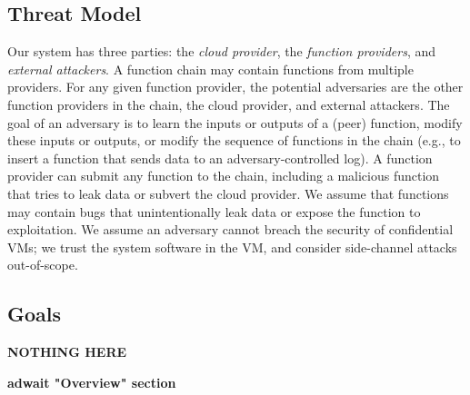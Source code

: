 \subsection{Threat Model}
\label{sec:threat-model}

Our system has three parties: the \emph{cloud provider}, the \emph{function
providers}, and \emph{external attackers}.
%
A function chain may contain functions from multiple providers.
%
For any given function provider, the potential adversaries
are the other function providers in the chain, the cloud provider, and
external attackers.
%
The goal of an adversary is to learn the inputs or outputs of a (peer)
function, modify these inputs or outputs, or modify the sequence of functions
in the chain (e.g., to insert a function that sends data to an
adversary-controlled log).
%
A function provider can submit any function to the chain, including a
malicious function that tries to leak data or subvert the cloud
provider.
%
We assume that functions may contain bugs that unintentionally leak
data or expose the function to exploitation.
%
We assume an adversary cannot breach the security of confidential VMs; we trust
the system software in the VM, and consider side-channel attacks out-of-scope.
%


\subsection{Goals}
\label{sec:goals}
\textbf{NOTHING HERE}

\textbf{adwait "Overview" section}




